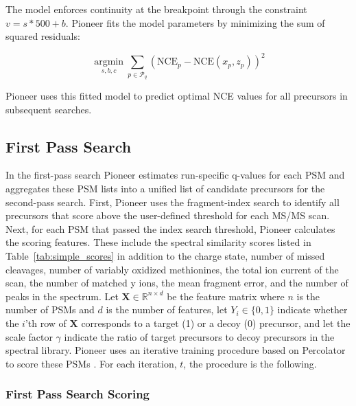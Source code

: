 \documentclass[pdflatex,sn-nature]{sn-jnl}
\begin{document}
The model enforces continuity at the breakpoint through the constraint $v = s*500 + b$. Pioneer fits the model parameters by minimizing the sum of squared residuals:

\begin{equation}
    \underset{s,b,c}{\operatorname{argmin}} \sum_{p \in \mathcal{P}_q} (\text{NCE}_p - \text{NCE}(x_p,z_p))^2
\end{equation}

Pioneer uses this fitted model to predict optimal NCE values for all precursors in subsequent searches.

\subsection{First Pass Search}\label{subsec:first-pass-search}

In the first-pass search Pioneer estimates run-specific q-values for each PSM and aggregates these PSM lists into a unified list of candidate precursors for the second-pass search. First, Pioneer uses the fragment-index search to identify all precursors that score above the user-defined threshold for each MS/MS scan. Next, for each PSM that passed the index search threshold, Pioneer calculates the scoring features. These include the spectral similarity scores listed in Table~\ref{tab:simple_scores} in addition to the charge state, number of missed cleavages, number of variably oxidized methionines, the total ion current of the scan, the number of matched y ions, the mean fragment error, and the number of peaks in the spectrum. Let $\mathbf{X} \in \mathbb{R}^{n \times d}$ be the feature matrix where $n$ is the number of PSMs and $d$ is the number of features, let $Y_i \in \{0,1\}$ indicate whether the $i$'th row of $\mathbf{X}$ corresponds to a target (1) or a decoy (0) precursor, and let the scale factor $\gamma$ indicate the ratio of target precursors to decoy precursors in the spectral library. Pioneer uses an iterative training procedure based on Percolator to score these PSMs \cite{Kall2007-sy}. For each iteration, $t$, the procedure is the following.

\subsubsection{First Pass Search Scoring}\label{subsubsec:first-pass-search-scoring}
\end{document}
